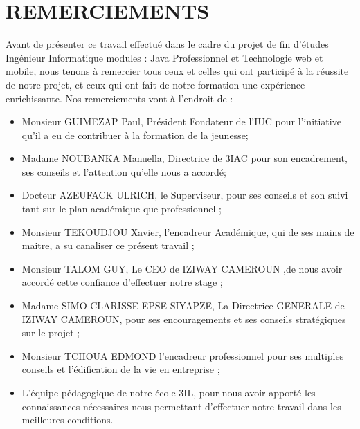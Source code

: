 \chapter*{REMERCIEMENTS}         %
\thispagestyle{fancy}
\vspace{-2cm}

Avant de présenter ce travail effectué dans le cadre du projet de fin d’études Ingénieur Informatique modules : Java Professionnel et Technologie web et mobile, nous tenons à remercier tous ceux et celles qui ont participé à la réussite de notre projet, et ceux qui ont fait de notre formation une expérience enrichissante. Nos remerciements vont à l’endroit de :

\begin{itemize}
	\item Monsieur GUIMEZAP Paul, Président Fondateur de l’IUC pour l’initiative qu’il a eu de contribuer à la formation de la jeunesse;
	
	\item Madame NOUBANKA Manuella, Directrice de 3IAC pour son encadrement, ses conseils et l'attention qu’elle nous a accordé;
	
	\item Docteur AZEUFACK ULRICH, le Superviseur, pour ses conseils et son suivi tant sur le plan académique que professionnel ; 
	
	\item Monsieur TEKOUDJOU Xavier, l’encadreur Académique, qui de ses mains de maitre, a su canaliser ce présent travail ; 
	
	\item Monsieur TALOM GUY, Le CEO de IZIWAY CAMEROUN ,de nous avoir accordé cette confiance d’effectuer notre stage ; 
	
	\item Madame SIMO CLARISSE EPSE SIYAPZE, La Directrice GENERALE de IZIWAY CAMEROUN, pour ses encouragements et ses conseils stratégiques sur le projet ; 

	\item Monsieur TCHOUA EDMOND  l’encadreur professionnel pour ses multiples conseils et l’édification de la vie en entreprise ;
	
	\item L’équipe pédagogique de notre école 3IL, pour nous avoir apporté les connaissances nécessaires nous permettant d’effectuer notre travail dans les meilleures conditions.
	
\end{itemize}
